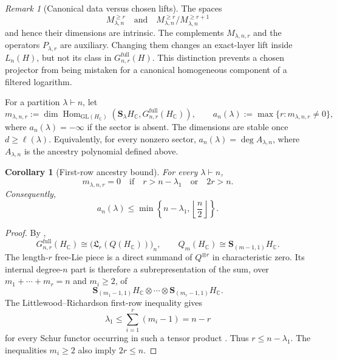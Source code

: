 \documentclass[10pt,reqno]{amsart}
\theoremstyle{plain}
\newtheorem{corollary}[theorem]{Corollary}
\theoremstyle{definition}
\theoremstyle{remark}
\newtheorem{remark}[theorem]{Remark}
\begin{document}
\begin{remark}[Canonical data versus chosen lifts]
\label{cc:rem-projectors-noncanonical}
The spaces
\[
 M^{\geq r}_{\lambda,n}
 \quad\text{and}\quad
 M^{\geq r}_{\lambda,n}/M^{\geq r+1}_{\lambda,n}
\]
and hence their dimensions are intrinsic.  The complements
\(M_{\lambda,n,r}\) and the operators \(P_{\lambda,r}\) are auxiliary.
Changing them changes an exact-layer lift inside \(L_n(H)\), but not its
class in \(G^{\mathrm{full}}_{n,r}(H)\).  This distinction prevents a
chosen projector from being mistaken for a canonical homogeneous
component of a filtered logarithm.
\end{remark}

For a partition \(\lambda\vdash n\), let
\begin{equation}
 m_{\lambda,n,r}:=
 \dim\operatorname{Hom}_{\mathrm{GL}(H_{\mathbb C})}
 \!\left(\mathbf S_\lambda H_{\mathbb C},
 G^{\mathrm{full}}_{n,r}(H_{\mathbb C})\right),
 \qquad
 a_n(\lambda):=\max\{r:m_{\lambda,n,r}\neq0\},
 \label{cc:eq-schur-ancestry-multiplicity}
\end{equation}
where \(a_n(\lambda)=-\infty\) if the sector is absent.  The dimensions
are stable once \(d\geq\ell(\lambda)\).
Equivalently, for every nonzero sector,
\(a_n(\lambda)=\deg A_{\lambda,n}\), where
\(A_{\lambda,n}\) is the ancestry polynomial defined above.

\begin{corollary}[First-row ancestry bound]
\label{cc:cor-first-row-ancestry}
For every \(\lambda\vdash n\),
\begin{equation}
 m_{\lambda,n,r}=0
 \quad\text{if}\quad
 r>n-\lambda_1
 \quad\text{or}\quad
 2r>n.
 \label{cc:eq-first-row-layer-bound}
\end{equation}
Consequently,
\begin{equation}
 a_n(\lambda)\leq
 \min\!\left\{n-\lambda_1,\left\lfloor\frac n2\right\rfloor\right\}.
 \label{cc:eq-first-row-ancestry-bound}
\end{equation}
\end{corollary}

\begin{proof}
By ,
\[
 G^{\mathrm{full}}_{n,r}(H_{\mathbb C})
 \cong\bigl({\mathfrak L}_r(Q(H_{\mathbb C}))\bigr)_n,
 \qquad
 Q_m(H_{\mathbb C})\cong
 \mathbf S_{(m-1,1)}H_{\mathbb C}.
\]
The length-\(r\) free-Lie piece is a direct summand of
\(Q^{\otimes r}\) in characteristic zero.  Its internal degree-\(n\)
part is therefore a subrepresentation of the sum, over
\(m_1+\cdots+m_r=n\) and \(m_i\geq2\), of
\[
 \mathbf S_{(m_1-1,1)}H_{\mathbb C}\otimes\cdots\otimes
 \mathbf S_{(m_r-1,1)}H_{\mathbb C}.
\]
The Littlewood--Richardson first-row inequality gives
\[
 \lambda_1\leq\sum_{i=1}^r(m_i-1)=n-r
\]
for every Schur functor occurring in such a tensor product
\cite[Chs.~5--6]{Fulton97}.  Thus \(r\leq n-\lambda_1\).
The inequalities \(m_i\geq2\) also imply \(2r\leq n\).
\end{proof}
\end{document}
